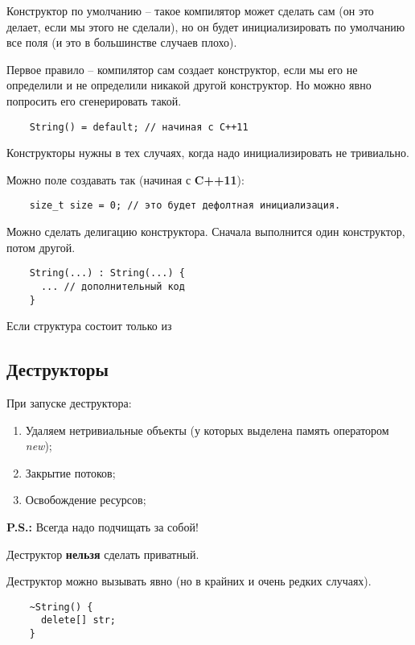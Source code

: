 \documentclass[12pt]{article}
\newcommand{\ps}{\textbf{P.S.: }}
\newcommand{\cppEleven}{\textbf{C++11}}
\begin{document}
Конструктор по умолчанию -- такое компилятор может сделать сам (он это делает, если мы этого не сделали), но он будет инициализировать по умолчанию все поля (и это в большинстве случаев плохо). 

Первое правило -- компилятор сам создает конструктор, если мы его не определили и не определили никакой другой конструктор. Но можно явно попросить его сгенерировать такой. 

\begin{lstlisting}
	String() = default; // начиная с C++11
\end{lstlisting}

Конструкторы нужны в тех случаях, когда надо инициализировать не тривиально. 

Можно поле создавать так (начиная с \cppEleven):

\begin{lstlisting}
	size_t size = 0; // это будет дефолтная инициализация. 
\end{lstlisting}

Можно сделать делигацию конструктора. Сначала выполнится один конструктор, потом другой. 

\begin{lstlisting}
	String(...) : String(...) {
	  ... // дополнительный код
	}
\end{lstlisting}

Если структура состоит только из 

\subsection{Деструкторы}

При запуске деструктора:

\begin{enumerate}
	\item Удаляем нетривиальные объекты (у которых выделена память оператором \textit{new});
	\item Закрытие потоков;
	\item Освобождение ресурсов; 
\end{enumerate}


\ps Всегда надо подчищать за собой!

Деструктор \textbf{нельзя} сделать приватный. 

Деструктор можно вызывать явно (но в крайних и очень редких случаях). 

\begin{lstlisting}
	~String() {
	  delete[] str;
	}
\end{lstlisting}
\end{document}
